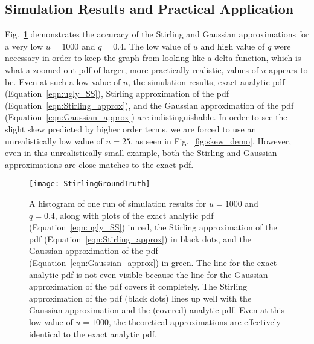 \documentclass[prodmode,acmtos]{acmsmall}
\begin{document}
\subsection{Simulation Results and Practical Application}
Fig.~\ref{fig:StirlingGroundTruth} demonstrates the accuracy of the Stirling and Gaussian approximations for a very low $u=1000$ and $q=0.4$.  The low value of $u$ and high value of $q$ were necessary in order to keep the graph from looking like a delta function, which is what a zoomed-out pdf of larger, more practically realistic, values of $u$ appears to be.  Even at such a low value of $u$, the simulation results, exact analytic pdf (Equation~\ref{eqn:ugly_SS}), Stirling approximation of the pdf (Equation~\ref{eqn:Stirling_approx}), and the Gaussian approximation of the pdf (Equation~\ref{eqn:Gaussian_approx}) are indistinguishable.  In order to see the slight skew predicted by higher order terms, we are forced to use an unrealistically low value of $u=25$, as seen in Fig.~\ref{fig:skew_demo}.  However, even in this unrealistically small example, both the Stirling and Gaussian approximations are close matches to the exact pdf. 

\begin{figure}
\centerline{\texttt{[image: StirlingGroundTruth]}}
\caption{A histogram of one run of simulation results for $u=1000$ and $q=0.4$, along with plots of the exact analytic pdf (Equation~\ref{eqn:ugly_SS}) in red, the Stirling approximation of the pdf (Equation~\ref{eqn:Stirling_approx}) in black dots, and the Gaussian approximation of the pdf (Equation~\ref{eqn:Gaussian_approx}) in green.  The line for the exact analytic pdf is not even visible because the line for the Gaussian approximation of the pdf covers it completely.  The Stirling approximation of the pdf (black dots) lines up well with the Gaussian approximation and the (covered) analytic pdf.  Even at this low value of $u=1000$, the theoretical approximations are effectively identical to the exact analytic pdf.}
\label{fig:StirlingGroundTruth}
\end{figure}
\end{document}
